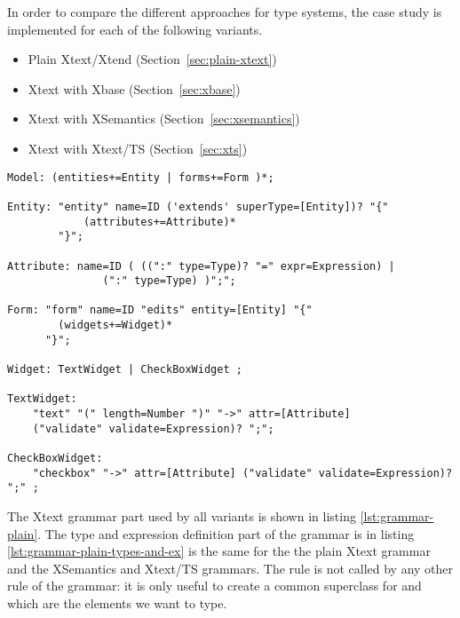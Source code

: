 In order to compare the different approaches for type systems, the case study is
implemented for each of the following variants.

\begin{itemize}
\item Plain Xtext/Xtend (Section~\ref{sec:plain-xtext})
\item Xtext with Xbase (Section~\ref{sec:xbase})
\item Xtext with XSemantics (Section~\ref{sec:xsemantics})
\item Xtext with Xtext/TS (Section~\ref{sec:xts})
\end{itemize}

%

\begin{lstlisting}[language=xtext,float,label=lst:grammar-plain,caption=Grammar
with plain Xtext.] 
Model: (entities+=Entity | forms+=Form )*;

Entity: "entity" name=ID ('extends' superType=[Entity])? "{"
			(attributes+=Attribute)*
		"}";

Attribute: name=ID ( ((":" type=Type)? "=" expr=Expression) | 
               (":" type=Type) )";";

Form: "form" name=ID "edits" entity=[Entity] "{"	
		(widgets+=Widget)*
	  "}";

Widget: TextWidget | CheckBoxWidget ;

TextWidget:
	"text" "(" length=Number ")" "->" attr=[Attribute] 
	("validate" validate=Expression)? ";";

CheckBoxWidget:
	"checkbox" "->" attr=[Attribute] ("validate" validate=Expression)? ";" ;
\end{lstlisting}

The Xtext grammar part used by all variants is shown in listing
\ref{lst:grammar-plain}. The type and expression definition part of the grammar
is in listing \ref{lst:grammar-plain-types-and-ex} is the same for the the plain
Xtext grammar and the XSemantics and Xtext/TS grammars. 
The rule  is not called by any other rule of the grammar: it is
only useful to create a common superclass for  and
 which are the elements we want to type.

